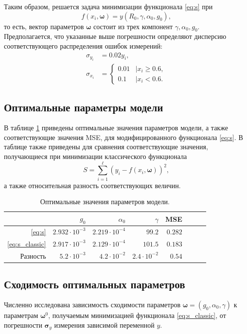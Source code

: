 \documentclass[tikz,11pt,a4paper]{article}
\begin{document}
Таким образом, решается задача минимизации функционала \eqref{eq:s} при
\[
  f(x_i, \boldsymbol{\omega}) = y(R_0, \gamma, \alpha_0, g_0),
\]
то есть, вектор параметров $\boldsymbol{\omega}$ состоит из трех компонент
$\gamma, \alpha_0, g_0$. Предполагается, что указанные выше погрешности определяют
дисперсию соответствующего распределения ошибок измерений:
\[
  \begin{array}{ll}
	\sigma_{y_i} &= 0.02 y_i,\\
	\sigma_{x_i} &= \left\{
	  \begin{array}{lr}
		0.01 & \mid x_i \geq 0.6, \\
		0.1  & \mid x_i < 0.6.
	  \end{array}
	\right.
\end{array}
\]

\subsection{Оптимальные параметры модели}
В таблице \ref{tabl:res_coeffs} приведены оптимальные значения параметров модели, а также
соответствующие значения MSE, для модифицированного функционала \eqref{eq:s}. В таблице
также приведены для сравнения соответствующие значения, получающиеся при минимизации
классического функционала
\begin{equation}
  S = \sum_{i = 1}^\ell (y_i - f(x_i, \boldsymbol{\omega}))^2,
  \label{eq:s_classic}
\end{equation}
а также относительная разность соответствующих величин.

\begin{table}[h]
  \caption{Оптимальные значения параметров модели.}
  \centering
  \begin{tabular}{| r | r | r | r | r | r | r | r |}
	\hline
							& $g_0$					& $\alpha_0$			& $\gamma$				& MSE		\\ \hline
	\eqref{eq:s}			& $2.932 \cdot 10^{-3}$	& $2.219 \cdot 10^{-4}$	& $99.2$				& $0.282$	\\ \hline
	\eqref{eq:s_classic}	& $2.917 \cdot 10^{-3}$	& $2.129 \cdot 10^{-4}$	& $101.5$				& $0.183$	\\ \hline
	Разность				& $5.2 \cdot 10^{-3}$	& $4.2 \cdot 10^{-2}$	& $2.4 \cdot 10^{-2}$	& $0.54$	\\ \hline
  \end{tabular}
  \label{tabl:res_coeffs}
\end{table}

\subsection{Сходимость оптимальных параметров}
Численно исследована зависимость сходимости параметров $\boldsymbol{\omega} = (g_0, \alpha_0, \gamma)$ к параметрам
$\boldsymbol{\omega}^0$, получаемым минимизацией функционала \eqref{eq:s_classic}, от
погрешности $\mathbf{\sigma}_y$ измерения зависимой переменной $y$.
\end{document}
